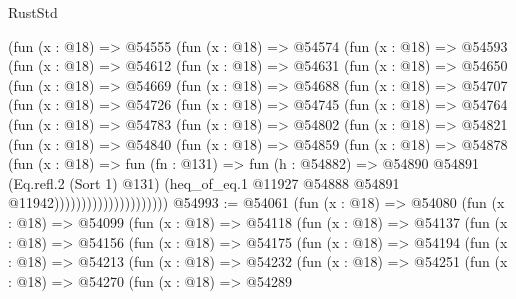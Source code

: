 \begin{lexlean}{RustStd}
\begin{coremodule}
{\begin{coremodule}
{{{{{{{{{{{{{{{{{{{{{{{{{{{{{{{{{{{{{{{{{{{{{{{{{{{{{{{{{{{{{{{{{{{{{{{{{{{{{{{{      (fun (x : @18) =>
      @54555
        (fun (x : @18) =>
        @54574
          (fun (x : @18) =>
          @54593
            (fun (x : @18) =>
            @54612
              (fun (x : @18) =>
              @54631
                (fun (x : @18) =>
                @54650
                  (fun (x : @18) =>
                  @54669
                    (fun (x : @18) =>
                    @54688
                      (fun (x : @18) =>
                      @54707
                        (fun (x : @18) =>
                        @54726
                          (fun (x : @18) =>
                          @54745
                            (fun (x : @18) =>
                            @54764
                              (fun (x : @18) =>
                              @54783
                                (fun (x : @18) =>
                                @54802
                                  (fun (x : @18) =>
                                  @54821
                                    (fun (x : @18) =>
                                    @54840
                                      (fun (x : @18) =>
                                      @54859
                                        (fun (x : @18) =>
                                        @54878
                                          (fun (x : @18) =>
                                          fun (fn : @131) =>
                                          fun (h : @54882) =>
                                          @54890
                                            @54891
                                            (Eq.refl.{2} (Sort 1) @131)
                                            (heq_of_eq.{1}
                                              @11927
                                              @54888
                                              @54891
                                              @11942)))))))))))))))))))))
@54993 := @54061
    (fun (x : @18) =>
    @54080
      (fun (x : @18) =>
      @54099
        (fun (x : @18) =>
        @54118
          (fun (x : @18) =>
          @54137
            (fun (x : @18) =>
            @54156
              (fun (x : @18) =>
              @54175
                (fun (x : @18) =>
                @54194
                  (fun (x : @18) =>
                  @54213
                    (fun (x : @18) =>
                    @54232
                      (fun (x : @18) =>
                      @54251
                        (fun (x : @18) =>
                        @54270
                          (fun (x : @18) =>
                          @54289
}}}}}}}}}}}}}}}}}}}}}}}}}}}}}}}}}}}}}}}}}}}}}}}}}}}}}}}}}}}}}}}}}}}}}}}}}}}}}}}}
\end{coremodule}}
\end{coremodule}
\end{lexlean}
